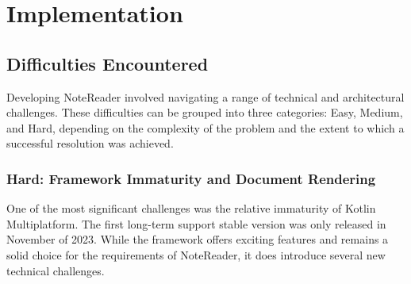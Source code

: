\chapter{Implementation}
\label{chap:imp}

\section{Difficulties Encountered}

    Developing NoteReader involved navigating a range of technical and architectural challenges. These difficulties can be grouped into three categories: Easy, Medium, and Hard, depending on the complexity of the problem and the extent to which a successful resolution was achieved.

    \subsection{Hard: Framework Immaturity and Document Rendering}
        
    
        One of the most significant challenges was the relative immaturity of Kotlin Multiplatform. The first long-term support stable version was only released in November of 2023. While the framework offers exciting features and remains a solid choice for the requirements of NoteReader, it does introduce several new technical challenges. 

        
